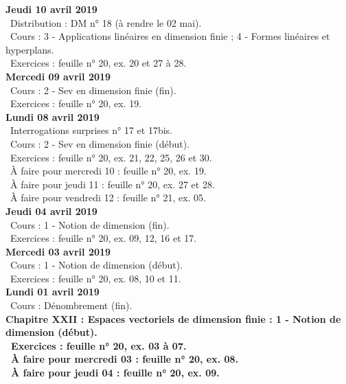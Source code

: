 \documentclass[12pt,a4paper]{article}
\begin{document}
\noindent\textbf{Jeudi 10 avril 2019}\\
\bu\ Distribution : DM n° 18 (à rendre le 02 mai).\\
\bu\ Cours : 3 - Applications linéaires en dimension finie ; 4 - Formes linéaires et hyperplans.\\
\bu\ Exercices : feuille n° 20, ex. 20 et 27 à 28.\vspace{.4cm}\\

\noindent\textbf{Mercedi 09 avril 2019}\\
\bu\ Cours : 2 - Sev en dimension finie (fin).\\
\bu\ Exercices : feuille n° 20, ex. 19.\vspace{.4cm}\\

\noindent\textbf{Lundi 08 avril 2019}\\
\bu\ Interrogations surprises n° 17 et 17bis.\\
\bu\ Cours : 2 - Sev en dimension finie (début).\\
\bu\ Exercices : feuille n° 20, ex. 21, 22, 25, 26 et 30.\\
\bu\ À faire pour mercredi 10 : feuille n° 20, ex. 19.\\
\bu\ À faire pour jeudi 11 : feuille n° 20, ex. 27 et 28.\\
\bu\ À faire pour vendredi 12 : feuille n° 21, ex. 05.\vspace{.4cm}\\

\noindent\textbf{Jeudi 04 avril 2019}\\
\bu\ Cours : 1 - Notion de dimension (fin).\\
\bu\ Exercices : feuille n° 20, ex. 09, 12, 16 et 17.\vspace{.4cm}\\

\noindent\textbf{Mercedi 03 avril 2019}\\
\bu\ Cours : 1 - Notion de dimension (début).\\
\bu\ Exercices : feuille n° 20, ex. 08, 10 et 11.\vspace{.4cm}\\

\noindent\textbf{Lundi 01 avril 2019}\\
\bu\ Cours : Dénombrement (fin).\\
\bf Chapitre XXII \rm : Espaces vectoriels de dimension finie  : 1 - Notion de dimension (début).\\
\bu\ Exercices : feuille n° 20, ex. 03 à 07.\\
\bu\ À faire pour mercredi 03 : feuille n° 20, ex. 08.\\
\bu\ À faire pour jeudi 04 : feuille n° 20, ex. 09.\vspace{.4cm}\\
\end{document}
